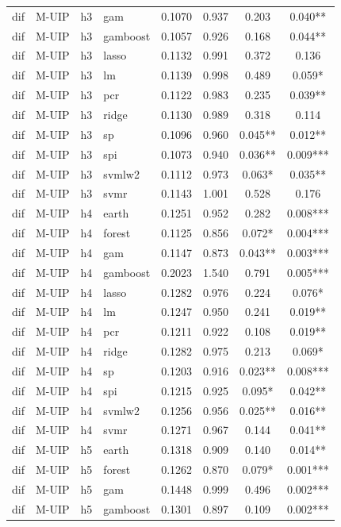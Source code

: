 \begin{ThreePartTable}
\begin{longtable}[t]{llclcccc}
dif & M-UIP & h3 & gam & 0.1070 & 0.937 & 0.203 & 0.040**\\
dif & M-UIP & h3 & gamboost & 0.1057 & 0.926 & 0.168 & 0.044**\\
dif & M-UIP & h3 & lasso & 0.1132 & 0.991 & 0.372 & 0.136\\
dif & M-UIP & h3 & lm & 0.1139 & 0.998 & 0.489 & 0.059*\\
dif & M-UIP & h3 & pcr & 0.1122 & 0.983 & 0.235 & 0.039**\\
dif & M-UIP & h3 & ridge & 0.1130 & 0.989 & 0.318 & 0.114\\
dif & M-UIP & h3 & sp & 0.1096 & 0.960 & 0.045** & 0.012**\\
dif & M-UIP & h3 & spi & 0.1073 & 0.940 & 0.036** & 0.009***\\
dif & M-UIP & h3 & svmlw2 & 0.1112 & 0.973 & 0.063* & 0.035**\\
dif & M-UIP & h3 & svmr & 0.1143 & 1.001 & 0.528 & 0.176\\
\addlinespace
dif & M-UIP & h4 & earth & 0.1251 & 0.952 & 0.282 & 0.008***\\
dif & M-UIP & h4 & forest & 0.1125 & 0.856 & 0.072* & 0.004***\\
dif & M-UIP & h4 & gam & 0.1147 & 0.873 & 0.043** & 0.003***\\
dif & M-UIP & h4 & gamboost & 0.2023 & 1.540 & 0.791 & 0.005***\\
dif & M-UIP & h4 & lasso & 0.1282 & 0.976 & 0.224 & 0.076*\\
dif & M-UIP & h4 & lm & 0.1247 & 0.950 & 0.241 & 0.019**\\
dif & M-UIP & h4 & pcr & 0.1211 & 0.922 & 0.108 & 0.019**\\
dif & M-UIP & h4 & ridge & 0.1282 & 0.975 & 0.213 & 0.069*\\
dif & M-UIP & h4 & sp & 0.1203 & 0.916 & 0.023** & 0.008***\\
dif & M-UIP & h4 & spi & 0.1215 & 0.925 & 0.095* & 0.042**\\
dif & M-UIP & h4 & svmlw2 & 0.1256 & 0.956 & 0.025** & 0.016**\\
dif & M-UIP & h4 & svmr & 0.1271 & 0.967 & 0.144 & 0.041**\\
\addlinespace
dif & M-UIP & h5 & earth & 0.1318 & 0.909 & 0.140 & 0.014**\\
dif & M-UIP & h5 & forest & 0.1262 & 0.870 & 0.079* & 0.001***\\
dif & M-UIP & h5 & gam & 0.1448 & 0.999 & 0.496 & 0.002***\\
dif & M-UIP & h5 & gamboost & 0.1301 & 0.897 & 0.109 & 0.002***\\

\end{longtable}
\end{ThreePartTable}
